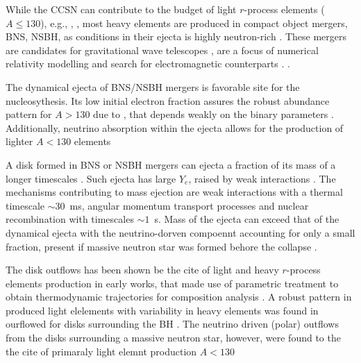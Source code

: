 While the \ac{CCSN} can contribute to the budget of light $r$-process elements ($A\leq 130$), e.g., \cite{Roberts et al., 2010; Fischer et al., 2010, Hrdepohl et al., 2010}, \cite{Martinez-Pinedo et al., 2012; Wanajo, 2013}, most heavy elements are produced in compact object mergers, \ac{BNS}, \ac{NSBH}, as conditions in their ejecta is highly neutron-rich \cite{(Lattimer and Schramm, 1974)}. These mergers are candidates for gravitational wave telescopes \cite{(e.g., LIGO Scientific Collaboration, 2010; IGO Scientific Collaboration et al., 2015)}, are a focus of numerical relativity modelling \cite{(e.g., Lehner and Pretorius, 2014; Paschalidis, 2017)} and search for electromagnetic counterparts \cite{(e.g., Rosswog, 2015; Fernandez and Metzger, 2016; Tanaka, 2016).}. 
.

The dynamical ejecta of \ac{BNS}/\ac{NSBH} mergers is favorable site for the \rproc{} nucleosythesis. Its low initial electron fraction assures the robust \rproc{} abundance pattern for $A>130$ due to  \cite{(e.g., Goriely et al., 2005),}, that depends weakly on the binary parameters \cite{(e.g., Goriely et al., 2011; Korobkin et al., 2012; Bauswein et al., 2013)}. Additionally, neutrino absorption within the ejecta allows for the production of lighter $A<130$ elements \cite{(e.g., Wanajo et al., 2014; Goriely et al., 2015; Sekiguchi et al., 2015; Radice et al., 2016; Foucart et al., 2016a,b; Roberts et al., 2017)}

A disk formed in \ac{BNS} or \ac{NSBH} mergers can ejecta a fraction of its mass of a longer timescales \cite{(e.g., Ruffert et al., 1997; Lee et al., 2009; Metzger et al., 2009b}. Such ejecta has large $Y_e$, raised by weak interactions \cite{(e.g., Dessart et al., 2009; Fernandez and Metzger, 2013; Perego et al., 2014)}. The mechanisms contributing to mass ejection are weak interactions with a thermal timescale $\sim30$~ms, angular momentum transport processes and nuclear recombination with timescales $\sim1$~s. Mass of the ejecta can exceed that of the dynamical ejecta \cite{e.g., Fernandez and Metzger, 2016} with the neutrino-dorven compoennt accounting for only a small fraction, present if massive neutron star was formed behore the collapse \cite{(Dessart et al., 2009; Fernandez and Metzger, 2013; Metzger and Fernandez, 2014; Just et al., 2015}. 

The disk outflows has been shown be the cite of light and heavy $r$-process elements production in early works, that made use of parametric treatment to obtain thermodynamic trajectories for composition analysis \cite{(e.g., Surman et al., 2008; Wanajo and Janka, 2012)}. A robust pattern in produced light elelements with variability in heavy elements was found in ourflowed for disks surrounding the BH \cite{Just et al., 2015; Wu et al., 2016)}. The neutrino driven (polar) outflows from the disks surrounding a massive neutron star, however, were found to the the cite of primaraly light elemnt production $A<130$ \cite{Martin et al., 2015, Perego et al., 2014}


